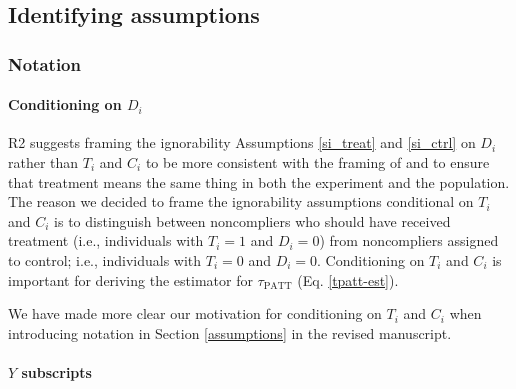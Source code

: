 \documentclass[hidelinks,12pt,letterpaper]{article}
\begin{document}
\subsection{Identifying assumptions}

\subsubsection{Notation}

\paragraph{Conditioning on $D_i$}

R2 suggests framing the ignorability Assumptions \ref{si_treat} and \ref{si_ctrl} on $D_i$ rather than $T_i$ and $C_i$ to be more consistent with the framing of \citet{Hartman} and to ensure that treatment means the same thing in both the experiment and the population. The reason we decided to frame the ignorability assumptions conditional on $T_i$ and $C_i$ is to distinguish between noncompliers who should have received treatment (i.e., individuals with $T_i=1$ and $D_i = 0$) from noncompliers assigned to control; i.e., individuals with $T_i = 0$ and $D_i = 0$. Conditioning on $T_i$ and $C_i$ is important for deriving the estimator for $\tau_{\text{PATT}}$ (Eq. \ref{tpatt-est}). 

We have made more clear our motivation for conditioning on  $T_i$ and $C_i$ when introducing notation in Section \ref{assumptions} in the revised manuscript. 

\paragraph{$Y$ subscripts}
\end{document}
